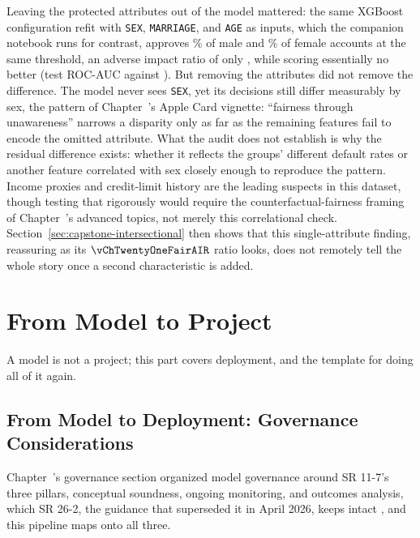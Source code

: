 \documentclass[../ai_in_finance]{subfiles}
\begin{document}
Leaving the protected attributes out of the model mattered: the same XGBoost configuration refit with \texttt{SEX}, \texttt{MARRIAGE}, and \texttt{AGE} as inputs, which the companion notebook runs for contrast, approves \vChTwentyOneDemoMaleApprovePct\% of male and \vChTwentyOneDemoFemaleApprovePct\% of female accounts at the same threshold, an adverse impact ratio of only \vChTwentyOneDemoAIR, while scoring essentially no better (test ROC-AUC \vChTwentyOneDemoAUC{} against \vChTwentyOneBakeXGBROCAUC). But removing the attributes did not remove the difference. The model never sees \texttt{SEX}, yet its decisions still differ measurably by sex, the pattern of Chapter~'s Apple Card vignette: ``fairness through unawareness'' narrows a disparity only as far as the remaining features fail to encode the omitted attribute. What the audit does not establish is why the residual difference exists: whether it reflects the groups' different default rates or another feature correlated with sex closely enough to reproduce the pattern. Income proxies and credit-limit history are the leading suspects in this dataset, though testing that rigorously would require the counterfactual-fairness framing of Chapter~'s advanced topics, not merely this correlational check. Section~\ref{sec:capstone-intersectional} then shows that this single-attribute finding, reassuring as its $\vChTwentyOneFairAIR$ ratio looks, does not remotely tell the whole story once a second characteristic is added.

\section{From Model to Project}

A model is not a project; this part covers deployment, and the template for doing all of it again.

\subsection{From Model to Deployment: Governance Considerations}
\label{sec:capstone-governance}

Chapter~'s governance section organized model governance around SR 11-7's three pillars, conceptual soundness, ongoing monitoring, and outcomes analysis, which SR 26-2, the guidance that superseded it in April 2026, keeps intact \parencite{frb2026revised}, and this pipeline maps onto all three.
\end{document}
